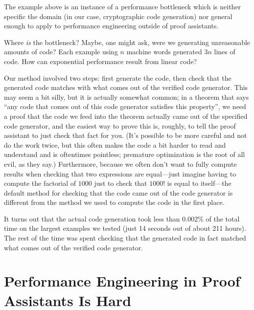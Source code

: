 The example above is an instance of a performance bottleneck which is neither specific the domain (in our case, cryptographic code generation) nor general enough to apply to performance engineering outside of proof assistants.

Where \emph{is} the bottleneck?
Maybe, one might ask, were we generating unreasonable amounts of code?
Each example using $n$ machine words generated $3n$ lines of code.
How can exponential performance result from linear code?

Our method involved two steps: first generate the code, then check that the generated code matches with what comes out of the verified code generator.
This may seem a bit silly, but it is actually somewhat common; in a theorem that says ``any code that comes out of this code generator satisfies this property'', we need a proof that the code we feed into the theorem actually came out of the specified code generator, and the easiest way to prove this is, roughly, to tell the proof assistant to just check that fact for you.
(It's possible to be more careful and not do the work twice, but this often makes the code a bit harder to read and understand and is oftentimes pointless; premature optimization is the root of all evil, as they say.)
Furthermore, because we often don't want to fully compute results when checking that two expressions are equal---just imagine having to compute the factorial of $1000$ just to check that $1000!$ is equal to itself---the default method for checking that the code came out of the code generator is different from the method we used to compute the code in the first place.

It turns out that the actual code generation took less than 0.002\% of the total time on the largest examples we tested (just 14 seconds out of about 211 hours).
The rest of the time was spent checking that the generated code in fact matched what comes out of the verified code generator.

\section{Performance Engineering in Proof Assistants Is Hard}


